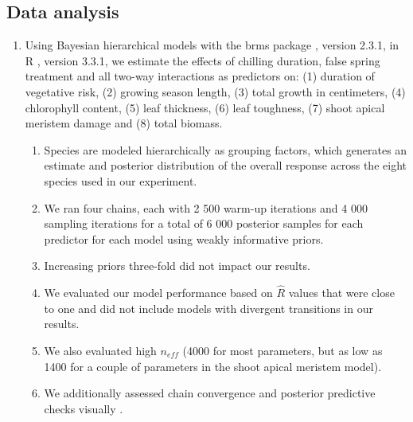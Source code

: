 \documentclass{article}\usepackage[]{graphicx}\usepackage[]{color}
\begin{document}
\subsection*{Data analysis}
\begin{enumerate}
\item Using Bayesian hierarchical models with the brms package \citep{brms}, version 2.3.1,  in R \citep{R}, version 3.3.1, we estimate the effects of chilling duration, false spring treatment and all two-way interactions as predictors on: (1) duration of vegetative risk, (2) growing season length, (3) total growth in centimeters, (4) chlorophyll content, (5) leaf thickness, (6) leaf toughness, (7) shoot apical meristem damage and (8) total biomass. %
  \begin{enumerate} %
  \item Species are modeled hierarchically as grouping factors, which generates an estimate and posterior distribution of the overall response across the eight species used in our experiment.
  \item We ran four chains, each with 2 500 warm-up iterations and 4 000 sampling iterations for a total of 6 000 posterior samples for each predictor for each model using weakly informative priors. 
  \item Increasing priors three-fold did not impact our results.
  \item We evaluated our model performance based on $\hat{R}$ values that were close to one and did not include models with divergent transitions in our results. 
  \item We also evaluated high $n_{eff}$ (4000 for most parameters, but as low as 1400 for a couple of parameters in the shoot apical meristem model). 
  \item We additionally assessed chain convergence and posterior predictive checks visually \citep{BDA}.
  \end{enumerate}
\end{enumerate}
\end{document}
